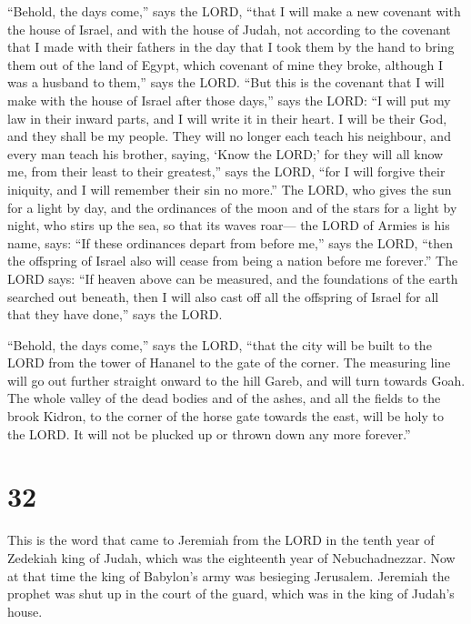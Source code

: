  ``Behold, the days come,'' says the LORD, ``that I will
make a new covenant with the house of Israel, and with the house of
Judah,  not according to the covenant that I made with
their fathers in the day that I took them by the hand to bring them out
of the land of Egypt, which covenant of mine they broke, although I was
a husband to them,'' says the LORD.  ``But this is the
covenant that I will make with the house of Israel after those days,''
says the LORD: ``I will put my law in their inward parts, and I will
write it in their heart. I will be their God, and they shall be my
people.  They will no longer each teach his neighbour, and
every man teach his brother, saying, `Know the LORD;' for they will all
know me, from their least to their greatest,'' says the LORD, ``for I
will forgive their iniquity, and I will remember their sin no more.''
 The LORD, who gives the sun for a light by day, and the
ordinances of the moon and of the stars for a light by night, who stirs
up the sea, so that its waves roar--- the LORD of Armies is his name,
says:  ``If these ordinances depart from before me,'' says
the LORD, ``then the offspring of Israel also will cease from being a
nation before me forever.''  The LORD says: ``If heaven
above can be measured, and the foundations of the earth searched out
beneath, then I will also cast off all the offspring of Israel for all
that they have done,'' says the LORD.

 ``Behold, the days come,'' says the LORD, ``that the city
will be built to the LORD from the tower of Hananel to the gate of the
corner.  The measuring line will go out further straight
onward to the hill Gareb, and will turn towards Goah.  The
whole valley of the dead bodies and of the ashes, and all the fields to
the brook Kidron, to the corner of the horse gate towards the east, will
be holy to the LORD. It will not be plucked up or thrown down any more
forever.''

\hypertarget{section-31}{%
\section{32}\label{section-31}}

 This is the word that came to Jeremiah from the LORD in the
tenth year of Zedekiah king of Judah, which was the eighteenth year of
Nebuchadnezzar.  Now at that time the king of Babylon's army
was besieging Jerusalem. Jeremiah the prophet was shut up in the court
of the guard, which was in the king of Judah's house.

